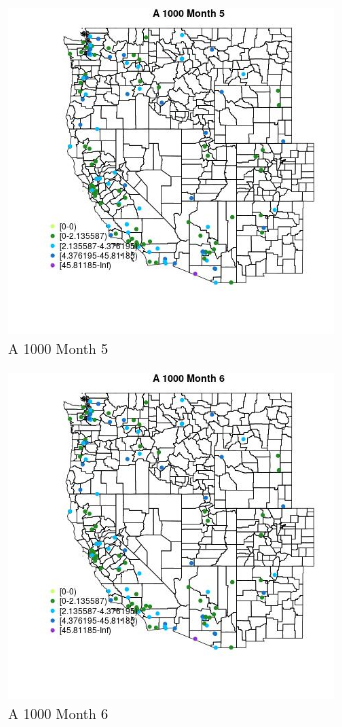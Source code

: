 \begin{figure} 
\centering  
\includegraphics[width=0.77\textwidth]{Code_Outputs/Report_ML_input_PM25_Step4_part_e_de_duplicated_aves_MapObsMo5A_1000.jpg} 
\caption{\label{fig:Report_ML_input_PM25_Step4_part_e_de_duplicated_avesMapObsMo5A_1000}A 1000 Month 5} 
\end{figure} 
 

\begin{figure} 
\centering  
\includegraphics[width=0.77\textwidth]{Code_Outputs/Report_ML_input_PM25_Step4_part_e_de_duplicated_aves_MapObsMo6A_1000.jpg} 
\caption{\label{fig:Report_ML_input_PM25_Step4_part_e_de_duplicated_avesMapObsMo6A_1000}A 1000 Month 6} 
\end{figure} 
 

